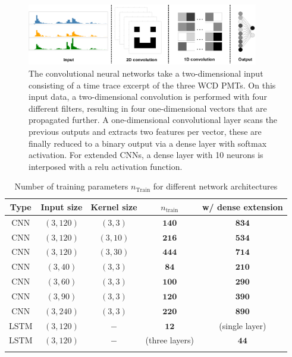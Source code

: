 \begin{figure}
	\centering
	\includegraphics[width=0.9\textwidth]{./imgs/CNN_architecture.png}
	\caption{The convolutional neural networks take a two-dimensional input consisting of a time trace excerpt of the three WCD PMTs. On this input data, a 
	two-dimensional convolution is performed with four different filters, resulting in four one-dimensional vectors that are propagated further. A one-dimensional
	convolutional layer scans the previous outputs and extracts two features per vector, these are finally reduced to a binary output via a dense layer with 
	softmax activation. For extended CNNs, a dense layer with 10 neurons is interposed with a relu activation function.}
	\label{fig:cnn-architecture}
\end{figure}

\begin{table}[h]
	\begin{center}
	\caption{Number of training parameters $n_\text{Train}$ for different network architectures}
	\begin{tabular*}{0.8\textwidth}{@{\extracolsep{\fill}} ccccc}
		\toprule
		Type & Input size & Kernel size & $n_\text{train}$ & w/ dense extension \\
		\midrule
		CNN & $(3, 120)$ & $(3, 3)$ & $\mathbf{140}$ & $\mathbf{834}$ \\
		CNN & $(3, 120)$ & $(3, 10)$ & $\mathbf{216}$ & $\mathbf{534}$ \\
		CNN & $(3, 120)$ & $(3, 30)$ & $\mathbf{444}$ & $\mathbf{714}$ \\
		CNN & $(3, 40)$ & $(3, 3)$ & $\mathbf{84}$ & $\mathbf{210}$ \\
		CNN & $(3, 60)$ & $(3, 3)$ & $\mathbf{100}$ & $\mathbf{290}$ \\
		CNN & $(3, 90)$ & $(3, 3)$ & $\mathbf{120}$ & $\mathbf{390}$ \\
		CNN & $(3, 240)$ & $(3, 3)$ & $\mathbf{220}$ & $\mathbf{890}$ \\
		LSTM & $(3, 120)$ & $-$ & $\mathbf{12}$ & (single layer) \\
		LSTM & $(3, 120)$ & $-$ & (three layers) & $\mathbf{44}$ \\
		\bottomrule
	\label{tab:network-parameters}
	\end{tabular*}
	\end{center}
\end{table}


